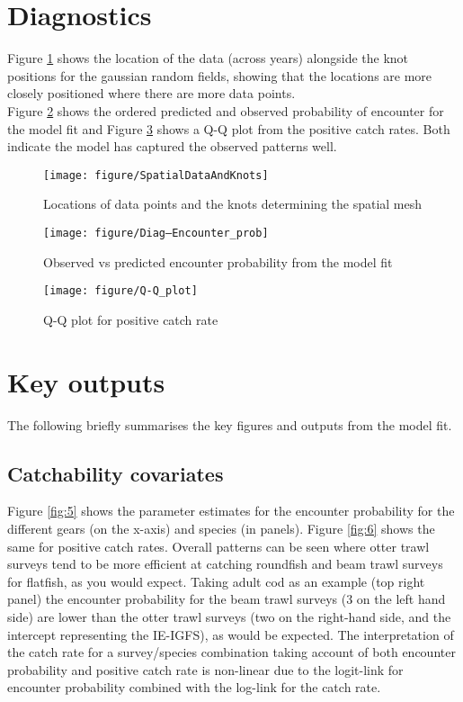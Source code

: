 \documentclass[11pt]{article}
\begin{document}
\section{Diagnostics}

Figure \ref{fig:2} shows the location of the data (across years) alongside the
knot positions for the gaussian random fields, showing that the locations are
more closely positioned where there are more data points. \\

Figure \ref{fig:3} shows the ordered predicted and observed probability of
encounter for the model fit and Figure \ref{fig:4} shows a Q-Q plot from the
positive catch rates. Both indicate the model has captured the observed
patterns well.

\begin{figure}[!phtb]
	\centering
\texttt{[image: figure/SpatialDataAndKnots]}
\caption{Locations of data points and the knots determining the spatial mesh}
\label{fig:2}
\end{figure}

\begin{figure}[!phtb]
	\centering
\texttt{[image: figure/Diag--Encounter\_prob]}
\caption{Observed vs predicted encounter probability from the model fit}
\label{fig:3}
\end{figure}

\begin{figure}[!phtb]
	\centering
\texttt{[image: figure/Q-Q\_plot]}
\caption{Q-Q plot for positive catch rate}
\label{fig:4}
\end{figure}

\section{Key outputs}

The following briefly summarises the key figures and outputs from the model
fit. 

\subsection{Catchability covariates}

Figure \ref{fig:5} shows the parameter estimates for the encounter probability
for the different gears (on the x-axis) and species (in panels). Figure
\ref{fig:6} shows the same for positive catch rates. Overall patterns can be
seen where otter trawl surveys tend to be more efficient at catching roundfish
and beam trawl surveys for flatfish, as you would expect. Taking adult cod as
an example (top right panel) the encounter probability for the beam trawl
surveys (3 on the left hand side) are lower than the otter trawl surveys (two
on the right-hand side, and the intercept representing the IE-IGFS), as would
be expected. The interpretation of the catch rate for a survey/species
combination taking account of both encounter probability and positive catch
rate is non-linear due to the logit-link for encounter probability combined
with the log-link for the catch rate.\\
\end{document}
